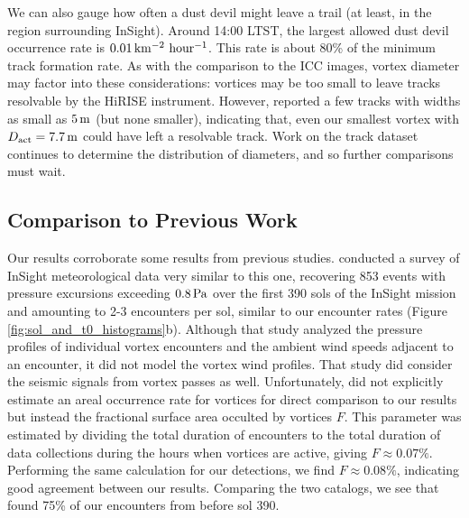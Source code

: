 \documentclass{aastex63}
\begin{document}
We can also gauge how often a dust devil might leave a trail (at least, in the region surrounding InSight). Around 14:00 LTST, the largest allowed dust devil occurrence rate is $0.01\,{\rm km^{-2}\ hour^{-1}}$. This rate is about 80\% of the minimum track formation rate. As with the comparison to the ICC images, vortex diameter may factor into these considerations: vortices may be too small to leave tracks resolvable by the HiRISE instrument. However, \citet{2020GeoRL..4787234P} reported a few tracks with widths as small as $5\,{\rm m}$ (but none smaller), indicating that, even our smallest vortex with $D_{\rm act} = 7.7\,{\rm m}$ could have left a resolvable track. Work on the track dataset continues to determine the distribution of diameters, and so further comparisons must wait.

\subsection{Comparison to Previous Work}
\label{sec:Comparison to Previous Work}

Our results corroborate some results from previous studies. \citet{2021Icar..35514119L} conducted a survey of InSight meteorological data very similar to this one, recovering 853 events with pressure excursions exceeding $0.8\,{\rm Pa}$ over the first 390 sols of the InSight mission and amounting to 2-3 encounters per sol, similar to our encounter rates (Figure \ref{fig:sol_and_t0_histograms}b). Although that study analyzed the pressure profiles of individual vortex encounters and the ambient wind speeds adjacent to an encounter, it did not model the vortex wind profiles. That study did consider the seismic signals from vortex passes as well. Unfortunately, \citet{2021Icar..35514119L} did not explicitly estimate an areal occurrence rate for vortices for direct comparison to our results but instead the fractional surface area occulted by vortices $F$. This parameter was estimated by dividing the total duration of encounters to the total duration of data collections during the hours when vortices are active, giving $F \approx 0.07\%$. Performing the same calculation for our detections, we find $F \approx 0.08\%$, indicating good agreement between our results. Comparing the two catalogs, we see that \citet{2021Icar..35514119L} found 75\% of our encounters from before sol 390.
\end{document}
